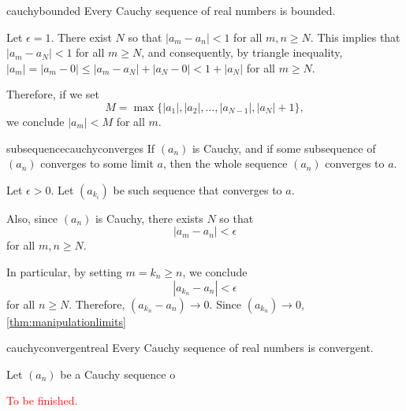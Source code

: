 
\begin{prop}{}{cauchybounded}
	Every Cauchy sequence of real numbers is bounded.
\end{prop}

\begin{dem}{}{}
	Let \(\epsilon = 1\). There exist \(N\) so that \(|a_m - a_n| < 1\) for all \(m, n \geq N\). This implies that \(|a_m - a_N| < 1\) for all \(m \geq N\), and consequently, by triangle inequality, \(|a_m| = |a_m - 0| \leq |a_m - a_N| + |a_N - 0| < 1 + |a_N|\) for all \(m \geq N\).

	Therefore, if we set \[
		M = \max\{|a_1|, |a_2|, \dots, |a_{N-1}|, |a_N| + 1\},
	\]
	we conclude \(|a_m| < M\) for all \(m\).
\end{dem}

\begin{prop}{}{subsequencecauchyconverges}
	If \((a_n)\) is Cauchy, and if some subsequence of \((a_n)\) converges to some limit \(a\), then the whole sequence \((a_n)\) converges to \(a\).
\end{prop}

\begin{dem}{}{}
	Let \(\epsilon > 0\). Let \((a_{k_i})\) be such sequence that converges to \(a\).

	Also, since \((a_n)\) is Cauchy, there exists \(N\) so that \[
		|a_m - a_n| < \epsilon
	\] for all \(m, n \geq N\).

	In particular, by setting \(m = k_n \geq n\), we conclude \[
		|a_{k_n} - a_n| < \epsilon
	\] for all \(n \geq N\). Therefore, \((a_{k_n} - a_n) \to 0\). Since \((a_{k_n}) \to 0\), \ref{thm:manipulationlimits}
\end{dem}

\begin{thm}{}{cauchyconvergentreal}
	Every Cauchy sequence of real numbers is convergent.
\end{thm}

\begin{dem}{}{}
	Let \((a_n)\) be a Cauchy sequence o

	\textcolor{red}{To be finished.}
\end{dem}

